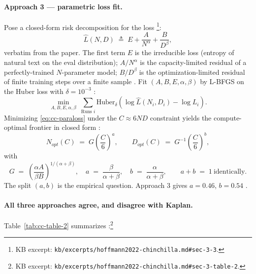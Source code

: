 \paragraph{Approach 3 --- parametric loss fit.}
Pose a closed-form risk decomposition for the loss
\citep[\S 3.3, eq.\ 2]{hoffmann2022-chinchilla}\footnote{KB excerpt:
\nolinkurl{kb/excerpts/hoffmann2022-chinchilla.md#sec-3-3}.}:
\begin{equation}
\hat{L}(N, D) \;\triangleq\; E + \frac{A}{N^{\alpha}} + \frac{B}{D^{\beta}},
\label{eq:cc-paraloss}
\tag{2}
\end{equation}
verbatim from the paper. The first term $E$ is the irreducible loss
(entropy of natural text on the eval distribution); $A/N^{\alpha}$ is
the capacity-limited residual of a perfectly-trained $N$-parameter
model; $B/D^{\beta}$ is the optimization-limited residual of finite
training steps over a finite sample
\citep[\S 3.3]{hoffmann2022-chinchilla}. Fit $(A, B, E, \alpha, \beta)$
by L-BFGS on the Huber loss with $\delta = 10^{-3}$
\citep[\S 3.3, eq.\ 3]{hoffmann2022-chinchilla}:
\begin{equation}
\min_{A,B,E,\alpha,\beta} \;\sum_{\text{Runs } i}
   \mathrm{Huber}_\delta\!\left(\log \hat{L}(N_i, D_i) - \log L_i\right).
\label{eq:cc-fit}
\tag{3}
\end{equation}
Minimizing \cref{eq:cc-paraloss} under the $C \approx 6 N D$
constraint yields the compute-optimal frontier in closed form
\citep[\S 3.3, eq.\ 4]{hoffmann2022-chinchilla}:
\begin{equation}
N_{opt}(C) \;=\; G \!\left(\frac{C}{6}\right)^{a}, \qquad
D_{opt}(C) \;=\; G^{-1}\!\left(\frac{C}{6}\right)^{b},
\label{eq:cc-frontier}
\tag{4}
\end{equation}
with
\begin{equation}
G \;=\; \left(\frac{\alpha A}{\beta B}\right)^{\!1/(\alpha + \beta)},
\quad a \;=\; \frac{\beta}{\alpha + \beta}, \quad
b \;=\; \frac{\alpha}{\alpha + \beta},
\qquad a + b \;=\; 1\ \text{identically.}
\label{eq:cc-abG}
\end{equation}
The split $(a, b)$ is the empirical question. Approach 3 gives
$a = 0.46$, $b = 0.54$ \citep[\S 3.3]{hoffmann2022-chinchilla}.

\paragraph{All three approaches agree, and disagree with Kaplan.}
Table~\ref{tab:cc-table-2} summarizes
\citep[\S 3, Table 2]{hoffmann2022-chinchilla}:\footnote{KB excerpt:
\nolinkurl{kb/excerpts/hoffmann2022-chinchilla.md#sec-3-table-2}.}

